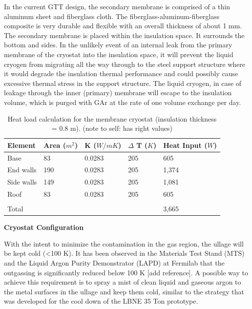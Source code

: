 In the current GTT design, the secondary membrane is comprised of a thin aluminum sheet and 
fiberglass cloth. The fiberglass-aluminum-fiberglass composite is very durable and flexible with an 
overall thickness of about 1 mm. The secondary membrane is placed within the insulation space. It 
surrounds the bottom and sides. In the unlikely event of an internal leak from the primary membrane of 
the cryostat into the insulation space, it will prevent the liquid cryogen from migrating all the way 
through to the steel support structure where it would degrade the insulation thermal performance and 
could possibly cause excessive thermal stress in the support structure. The liquid cryogen, in case of 
leakage through the inner (primary) membrane will escape to the insulation volume, which is purged with 
GAr at the rate of one volume exchange per day.

\begin{table}[htpb]
\caption{Heat load calculation for the membrane cryostat (insulation thickness = 0.8 m). (note to self: has right values)}
\label{tbl:heat-load-calc}
\centering
\begin{tabular}{|p{}|p{}|p{}|p{}|p{}|}
\hline
 \textbf{Element} & \textbf{Area ($m^2$)}  &  \textbf{K ($W/mK$)} & \textbf{$\Delta$ T ($K$)}
 & \textbf{Heat Input ($W$)}\\ \hline
Base   & 83  & 0.0283   &205   & 605 \\ \hline
End walls  &  190 & 0.0283  &  205 &  1,374\\ \hline
Side walls   & 149  & 0.0283  &  205 & 1,081 \\ \hline
Roof  &  83 & 0.0283  & 205  &  605\\ \hline
   &   &   &   &  \\ \hline
Total   &   &   &   & 3,665 \\ \hline
\end{tabular}
\end{table}

\textbf{Cryostat Configuration}

With the intent to minimize the contamination in the gas region, the ullage will be kept cold (\textless 100 K). It has been observed in the Materials Test Stand (MTS) and the Liquid Argon Purity Demonstrator (LAPD) at Fermilab that the outgassing is significantly reduced below 100 K [add reference]. A possible way to achieve this requirement is to spray a mist of clean liquid and gaseous argon to the metal surfaces in the ullage and keep them cold, similar to the strategy that was developed for the cool down of the LBNE 35 Ton prototype.

